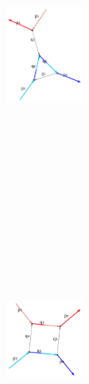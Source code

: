 \documentclass[
  11pt,
  a4paper,
  DIV=11,
  numbers=noendperiod,
  twoside]{scrreprt}
\DeclareRobustCommand{\[}{\begin{equation}}
\DeclareRobustCommand{\]}{\end{equation}}
\begin{document}
\begin{figure}

\begin{minipage}[t]{0.20\linewidth}

{\centering 

\begin{figure}[H]

{\centering \includegraphics[width=1in,height=3.5in]{./scattering_files/figure-latex/dot-figure-9.png}

}

\end{figure}

}

\end{minipage}%
%
\begin{minipage}[t]{0.20\linewidth}

{\centering 

\begin{figure}[H]

{\centering \includegraphics[width=1in,height=3.5in]{./scattering_files/figure-latex/dot-figure-8.png}

}
\end{figure}}
\end{minipage}
\end{figure}
\end{document}
